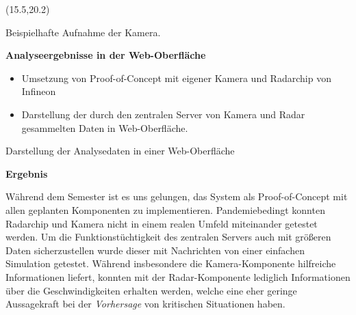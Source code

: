 \documentclass[%
textcolor=HDA_lightblue,	%
pagecolor=radacc_darkblue,		%
]{../estposter}
\begin{document}

\begin{textblock}{12.5}(15.5,20.2)

\color{HDA_gray_0}
Beispielhafte Aufnahme der Kamera.
\par\smallskip

\color{HDA_gray_0}
\textbf{Analyseergebnisse in der Web-Oberfläche}
\par\smallskip

\color{HDA_lightblue}

\begin{itemize}[leftmargin=10pt, rightmargin=10pt, topsep=3pt,itemsep=1pt,partopsep=1pt, parsep=1pt]
\item Umsetzung von Proof-of-Concept mit eigener Kamera und Radarchip von Infineon
		
\item Darstellung der durch den zentralen Server von Kamera und Radar gesammelten Daten in Web-Oberfläche.

\end{itemize}

\par\bigskip
\par\bigskip
\par\bigskip
\par\bigskip
\par\bigskip
\par\bigskip
\par\bigskip
\par\bigskip
\par\bigskip
\par\medskip

\color{HDA_gray_0}
Darstellung der Analysedaten in einer Web-Oberfläche
\par\smallskip

\color{HDA_gray_0}
\textbf{Ergebnis}
\par\smallskip

\color{HDA_lightblue}
Während dem Semester ist es uns gelungen, das System als Proof-of-Concept mit allen geplanten Komponenten zu implementieren. Pandemiebedingt konnten Radarchip und Kamera nicht in einem realen Umfeld miteinander getestet werden. Um die Funktionstüchtigkeit des zentralen Servers auch mit größeren Daten sicherzustellen wurde dieser mit Nachrichten von einer einfachen Simulation getestet. Während insbesondere die Kamera-Komponente hilfreiche Informationen liefert, konnten mit der Radar-Komponente lediglich Informationen über die Geschwindigkeiten erhalten werden, welche eine eher geringe Aussagekraft bei der \emph{Vorhersage} von kritischen Situationen haben.


\end{textblock}
\end{document}
